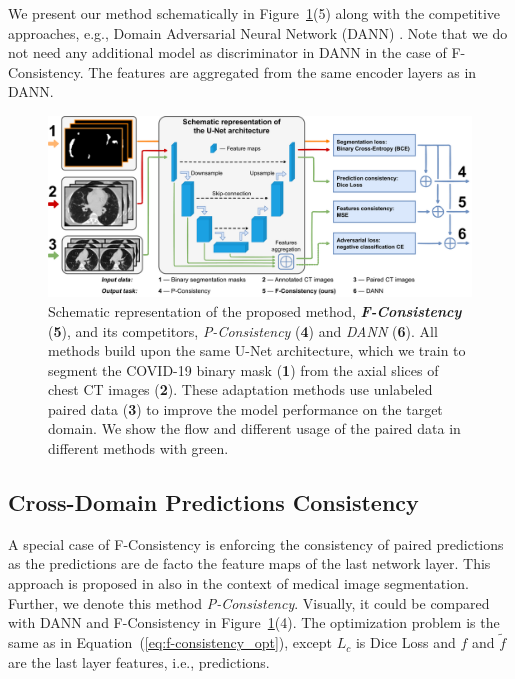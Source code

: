 We present our method schematically in Figure~\ref{fig:method_schematic}(5) along with the competitive approaches, e.g., Domain Adversarial Neural Network (DANN) \cite{dann}. Note that we do not need any additional model as discriminator in DANN in the case of F-Consistency. The features are aggregated from the same encoder layers as in DANN.

\begin{landscape}
\begin{figure}[p]
	\centering
	\includegraphics[width=\linewidth]{Dissertation/Figures/3_ct/method_schematic_4.pdf}
	\caption{Schematic representation of the proposed method, \textit{\textbf{F-Consistency}} (\textbf{5}), and its competitors, \textit{P-Consistency} (\textbf{4}) and \textit{DANN} (\textbf{6}). All methods build upon the same U-Net architecture, which we train to segment the COVID-19 binary mask (\textbf{1}) from the axial slices of chest CT images (\textbf{2}). These adaptation methods use unlabeled paired data (\textbf{3}) to improve the model performance on the target domain. We show the flow and different usage of the paired data in different methods with green.\label{fig:method_schematic}}
\end{figure}
\end{landscape}

\subsection{Cross-Domain Predictions Consistency}

A special case of F-Consistency is enforcing the consistency of paired predictions as the predictions are de facto the feature maps of the last network layer. This approach is proposed in \cite{orbes2019multi} also in the context of medical image segmentation. Further, we denote this method \textit{P-Consistency}. Visually, it could be compared with DANN and F-Consistency in Figure~\ref{fig:method_schematic}(4). The optimization problem is the same as in Equation~(\ref{eq:f-consistency_opt}), except $L_c$ is Dice Loss \cite{milletari2016v} and $f$ and $\tilde{f}$ are the last layer features, i.e., predictions.



